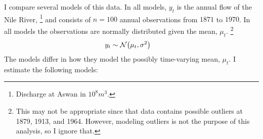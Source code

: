 I compare several models of this data.
In all models, $y_{t}$ is the annual flow of the Nile River,%
\footnote{Discharge at Aswan in $10^8 m^{3}$.} %
and consists of $n = 100$ annual observations from $1871$ to $1970$.
In all models the observations are normally distributed given the mean, $\mu_{t}$.%
\footnote{
  This may not be appropriate since that data contains possible outliers at 1879, 1913, and 1964.
  However, modeling outliers is not the purpose of this analysis, so I ignore that.
}
\begin{equation}
  \label{dlm:eq:10}
  \begin{aligned}[t]
    y_{t} &\sim \mathcal{N}\mathopen{}\left(\mu_{t}, \sigma^{2}\right)\mathclose{}
  \end{aligned}
\end{equation}
The models differ in how they model the possibly time-varying mean, $\mu_{t}$.
I estimate the following models:
